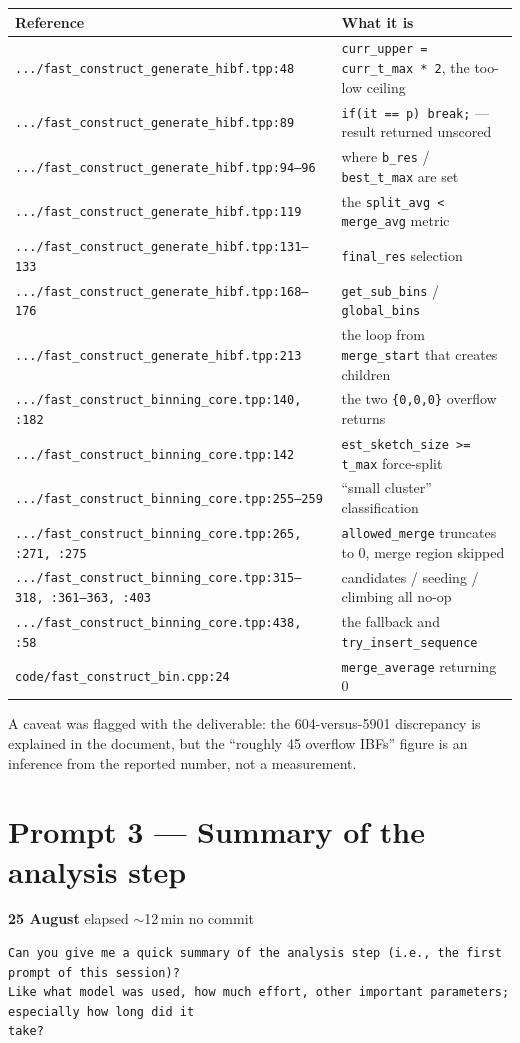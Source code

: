 \documentclass[11pt,a4paper]{article}
\newenvironment{promptbox}{\medskip}{\medskip}
\newcommand{\code}[1]{\lstinline[basicstyle=\ttfamily\small]!#1!}
\begin{document}
\begin{longtable}{@{}p{9.4cm}p{5.8cm}@{}}
\toprule
\textbf{Reference} & \textbf{What it is} \\
\midrule
\endhead
\texttt{.../fast\_construct\_generate\_hibf.tpp:48} & \code{curr_upper = curr_t_max * 2}, the too-low ceiling \\
\texttt{.../fast\_construct\_generate\_hibf.tpp:89} & \code{if(it == p) break;} --- result returned unscored \\
\texttt{.../fast\_construct\_generate\_hibf.tpp:94--96} & where \code{b_res} / \code{best_t_max} are set \\
\texttt{.../fast\_construct\_generate\_hibf.tpp:119} & the \code{split_avg < merge_avg} metric \\
\texttt{.../fast\_construct\_generate\_hibf.tpp:131--133} & \code{final_res} selection \\
\texttt{.../fast\_construct\_generate\_hibf.tpp:168--176} & \code{get_sub_bins} / \code{global_bins} \\
\texttt{.../fast\_construct\_generate\_hibf.tpp:213} & the loop from \code{merge_start} that creates children \\
\texttt{.../fast\_construct\_binning\_core.tpp:140, :182} & the two \code{{0,0,0}} overflow returns \\
\texttt{.../fast\_construct\_binning\_core.tpp:142} & \code{est_sketch_size >= t_max} force-split \\
\texttt{.../fast\_construct\_binning\_core.tpp:255--259} & ``small cluster'' classification \\
\texttt{.../fast\_construct\_binning\_core.tpp:265, :271, :275} & \code{allowed_merge} truncates to 0, merge region skipped \\
\texttt{.../fast\_construct\_binning\_core.tpp:315--318, :361--363, :403} & candidates / seeding / climbing all no-op \\
\texttt{.../fast\_construct\_binning\_core.tpp:438, :58} & the fallback and \code{try_insert_sequence} \\
\texttt{code/fast\_construct\_bin.cpp:24} & \code{merge_average} returning 0 \\
\bottomrule
\end{longtable}

\noindent A caveat was flagged with the deliverable: the 604-versus-5901 discrepancy is explained
in the document, but the ``roughly 45 overflow IBFs'' figure is an inference from the reported
number, not a measurement.

\section{Prompt 3 --- Summary of the analysis step}
\textbf{25 August} \textperiodcentered{} elapsed ${\sim}$12\,min \textperiodcentered{} no commit
\begin{promptbox}
\begin{lstlisting}[style=promptstyle]
Can you give me a quick summary of the analysis step (i.e., the first prompt of this session)?
Like what model was used, how much effort, other important parameters; especially how long did it
take?
\end{lstlisting}
\end{promptbox}
\end{document}

